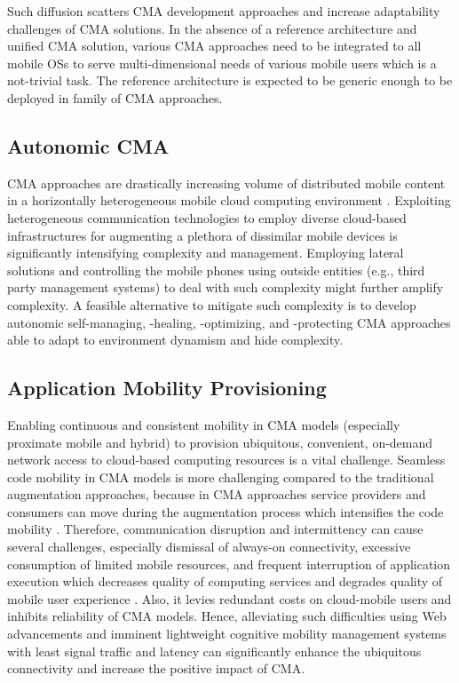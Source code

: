 \documentclass[publish]{IEEEtran}
\begin{document}
Such diffusion scatters CMA development approaches and increase adaptability challenges of CMA solutions. In the absence of a reference architecture and unified CMA solution, various CMA approaches need to be integrated to all mobile OSs to serve multi-dimensional needs of various mobile users which is a not-trivial task. The reference architecture is expected to be generic enough to be deployed in family of CMA approaches.

\subsection{Autonomic CMA}
CMA approaches are drastically increasing volume of distributed mobile content in a horizontally heterogeneous mobile cloud computing environment \cite{ZohrehSanaei2012}. Exploiting heterogeneous communication technologies to employ diverse cloud-based infrastructures for augmenting a plethora of dissimilar mobile devices is significantly intensifying complexity and management. Employing lateral solutions and controlling the mobile phones using outside entities (e.g., third party management systems) to deal with such complexity might further amplify complexity. A feasible alternative to mitigate such complexity is to develop autonomic self-managing, -healing, -optimizing, and -protecting CMA approaches \cite{Buyya2012} able to adapt to environment dynamism and hide complexity.

\subsection{Application Mobility Provisioning}
Enabling continuous and consistent mobility in CMA models (especially proximate mobile and hybrid) to provision ubiquitous, convenient, on-demand network access to cloud-based computing resources is a vital challenge. Seamless code mobility in CMA models is more challenging compared to the traditional augmentation approaches, because in CMA approaches service providers and consumers can move during the augmentation process which intensifies the code mobility \cite{Yu2012}. Therefore, communication disruption and intermittency can cause several challenges, especially dismissal of always-on connectivity, excessive consumption of limited mobile resources, and frequent interruption of application execution which decreases quality of computing services and degrades quality of mobile user experience \cite{Satyanarayanan2005}. Also, it levies redundant costs on cloud-mobile users and inhibits reliability of CMA models. Hence, alleviating such difficulties using Web advancements\cite{Johansson2012} and imminent lightweight cognitive mobility management systems with least signal traffic and latency can significantly enhance the ubiquitous connectivity and increase the positive impact of CMA.
\end{document}
